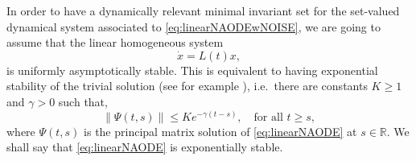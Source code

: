 \documentclass[reqno]{amsart}
\theoremstyle{definition}
\numberwithin{equation}{section}
\newcommand{\R}{\mathbb{R}}
\begin{document}
In order to have a dynamically relevant minimal invariant set for the set-valued dynamical system associated to \eqref{eq:linearNAODEwNOISE}, we are going to assume that the linear homogeneous system \begin{equation}\label{eq:linearNAODE}
\dot x=L(t)x,    
\end{equation} 
is uniformly asymptotically stable. This is equivalent to having exponential stability of the trivial solution (see for example \cite[Theorem~4.4.2]{adrianova1995introduction}), i.e.~there are constants $K\ge1$ and $\gamma>0$ such that,
\[
\|\Psi(t,s)\|\le Ke^{-\gamma(t-s)},\quad\text{for all }t\ge s,
\]
where $\Psi(t,s)$ is the principal matrix solution of \eqref{eq:linearNAODE} at $s\in\R$. We shall say that \eqref{eq:linearNAODE} is exponentially stable.

\end{document}
